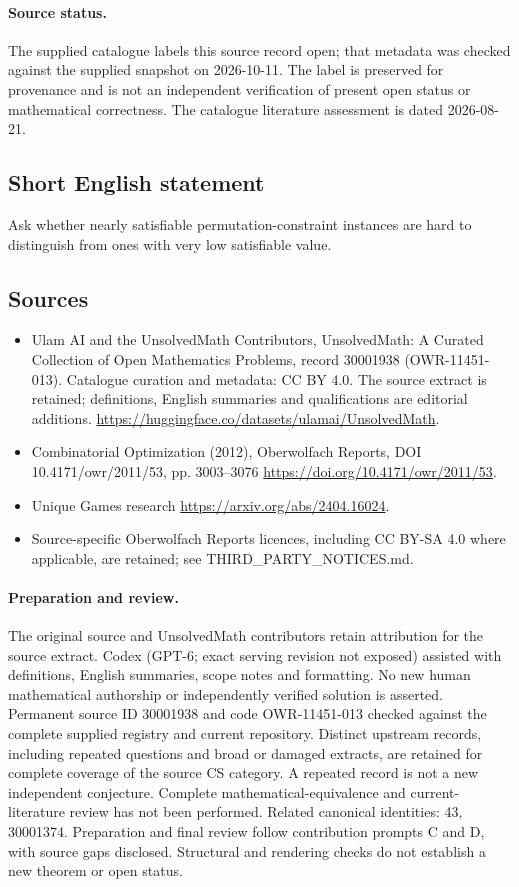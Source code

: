 \documentclass[11pt]{article}
\begin{document}
\paragraph{Source status.}
The supplied catalogue labels this source record open; that metadata was checked against the supplied snapshot on 2026-10-11. The label is preserved for provenance and is not an independent verification of present open status or mathematical correctness. The catalogue literature assessment is dated 2026-08-21.
\subsection{Short English statement}
Ask whether nearly satisfiable permutation-constraint instances are hard to distinguish from ones with very low satisfiable value.
\subsection{Sources}
\begin{itemize}
\item[\hypertarget{source:30001938:1}{S1}] Ulam AI and the UnsolvedMath Contributors, UnsolvedMath: A Curated Collection of Open Mathematics Problems, record 30001938 (OWR-11451-013). Catalogue curation and metadata: CC BY 4.0. The source extract is retained; definitions, English summaries and qualifications are editorial additions.
\url{https://huggingface.co/datasets/ulamai/UnsolvedMath}.
\item[\hypertarget{source:30001938:2}{S2}] Combinatorial Optimization (2012), Oberwolfach Reports, DOI 10.4171/owr/2011/53, pp. 3003--3076
\url{https://doi.org/10.4171/owr/2011/53}.
\item[\hypertarget{source:30001938:3}{S3}] Unique Games research
\url{https://arxiv.org/abs/2404.16024}.
\item Source-specific Oberwolfach Reports licences, including CC BY-SA 4.0 where applicable, are retained; see THIRD\_PARTY\_NOTICES.md.
\end{itemize}
\paragraph{Preparation and review.}
The original source and UnsolvedMath contributors retain attribution for the source extract. Codex (GPT-6; exact serving revision not exposed) assisted with definitions, English summaries, scope notes and formatting. No new human mathematical authorship or independently verified solution is asserted. Permanent source ID 30001938 and code OWR-11451-013 checked against the complete supplied registry and current repository. Distinct upstream records, including repeated questions and broad or damaged extracts, are retained for complete coverage of the source CS category. A repeated record is not a new independent conjecture. Complete mathematical-equivalence and current-literature review has not been performed. Related canonical identities: 43, 30001374. Preparation and final review follow contribution prompts C and D, with source gaps disclosed. Structural and rendering checks do not establish a new theorem or open status.
\label{end:30001938}
\end{document}
